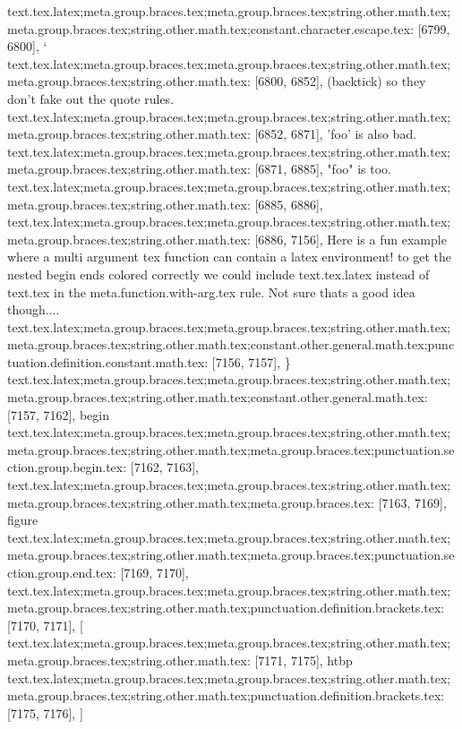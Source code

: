 {{{{{{{{{{{{{{{{{{{{{{{{{{{{{{{{{{{{{{{{{{{{{{{{{{{{{{{{{{{{{{{{{{{{{{{{{{{{{{{{{{{{{{{{{{{{{{{{{{{{{{{{{{{{{{{{{{{{{{{{{{{{{{{{{{{{{{{{{{{{{{{{{{{{{{{{{{{{{{{{{{{{{{{{{{{{{{{{{{{{{{{{{{text.tex.latex;meta.group.braces.tex;meta.group.braces.tex;string.other.math.tex;meta.group.braces.tex;string.other.math.tex;constant.character.escape.tex: [6799, 6800], {`}
text.tex.latex;meta.group.braces.tex;meta.group.braces.tex;string.other.math.tex;meta.group.braces.tex;string.other.math.tex: [6800, 6852], { (backtick) so they don't fake out the quote rules.
}
text.tex.latex;meta.group.braces.tex;meta.group.braces.tex;string.other.math.tex;meta.group.braces.tex;string.other.math.tex: [6852, 6871], {'foo' is also bad.
}
text.tex.latex;meta.group.braces.tex;meta.group.braces.tex;string.other.math.tex;meta.group.braces.tex;string.other.math.tex: [6871, 6885], {"foo" is too.
}
text.tex.latex;meta.group.braces.tex;meta.group.braces.tex;string.other.math.tex;meta.group.braces.tex;string.other.math.tex: [6885, 6886], {
}
text.tex.latex;meta.group.braces.tex;meta.group.braces.tex;string.other.math.tex;meta.group.braces.tex;string.other.math.tex: [6886, 7156], {Here is a fun example where a multi argument tex function can contain a latex environment!  to get the nested begin ends colored correctly we could include text.tex.latex instead of text.tex in the meta.function.with-arg.tex rule.  Not sure thats a good idea though....
}
text.tex.latex;meta.group.braces.tex;meta.group.braces.tex;string.other.math.tex;meta.group.braces.tex;string.other.math.tex;constant.other.general.math.tex;punctuation.definition.constant.math.tex: [7156, 7157], {\}
text.tex.latex;meta.group.braces.tex;meta.group.braces.tex;string.other.math.tex;meta.group.braces.tex;string.other.math.tex;constant.other.general.math.tex: [7157, 7162], {begin}
text.tex.latex;meta.group.braces.tex;meta.group.braces.tex;string.other.math.tex;meta.group.braces.tex;string.other.math.tex;meta.group.braces.tex;punctuation.section.group.begin.tex: [7162, 7163], {{}
text.tex.latex;meta.group.braces.tex;meta.group.braces.tex;string.other.math.tex;meta.group.braces.tex;string.other.math.tex;meta.group.braces.tex: [7163, 7169], {figure}
text.tex.latex;meta.group.braces.tex;meta.group.braces.tex;string.other.math.tex;meta.group.braces.tex;string.other.math.tex;meta.group.braces.tex;punctuation.section.group.end.tex: [7169, 7170], {}}
text.tex.latex;meta.group.braces.tex;meta.group.braces.tex;string.other.math.tex;meta.group.braces.tex;string.other.math.tex;punctuation.definition.brackets.tex: [7170, 7171], {[}
text.tex.latex;meta.group.braces.tex;meta.group.braces.tex;string.other.math.tex;meta.group.braces.tex;string.other.math.tex: [7171, 7175], {htbp}
text.tex.latex;meta.group.braces.tex;meta.group.braces.tex;string.other.math.tex;meta.group.braces.tex;string.other.math.tex;punctuation.definition.brackets.tex: [7175, 7176], {]}
}}}}}}}}}}}}}}}}}}}}}}}}}}}}}}}}}}}}}}}}}}}}}}}}}}}}}}}}}}}}}}}}}}}}}}}}}}}}}}}}}}}}}}}}}}}}}}}}}}}}}}}}}}}}}}}}}}}}}}}}}}}}}}}}}}}}}}}}}}}}}}}}}}}}}}}}}}}}}}}}}}}}}}}}}}}}}}}}}}}}}}}}}}}
